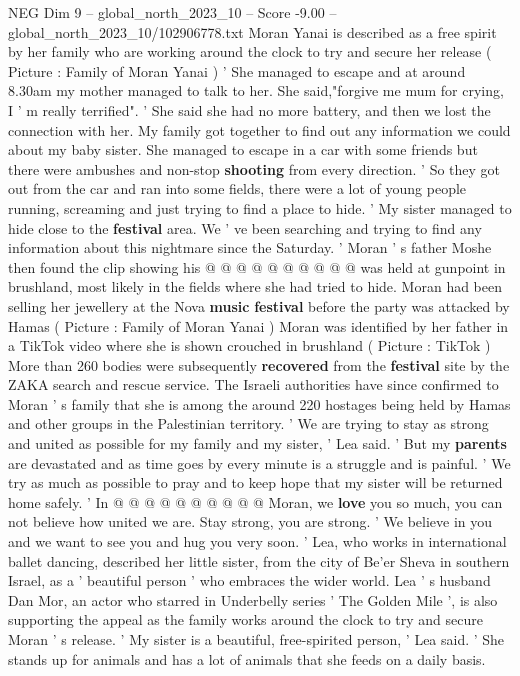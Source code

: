 \begin{textsample}{NEG Dim 9 – global\_north\_2023\_10 – Score -9.00 – global\_north\_2023\_10/102906778.txt}  \label{ex:f9_neg_035}
Moran Yanai is described as a free spirit by her family who are working around the clock to try and secure her release ( Picture : Family of Moran Yanai ) ' She managed to escape and at around 8.30am my mother managed to talk to her.
She said,"forgive me mum for crying, I ' m really terrified". ' She said she had no more battery, and then we lost the connection with her.
My family got together to find out any information we could about my baby sister.
She managed to escape in a car with some friends but there were ambushes and non-stop \textbf{shooting} from every direction. ' So they got out from the car and ran into some fields, there were a lot of young people running, screaming and just trying to find a place to hide. ' My sister managed to hide close to the \textbf{festival} area.
We ' ve been searching and trying to find any information about this nightmare since the Saturday. ' Moran ' s father Moshe then found the clip showing his @ @ @ @ @ @ @ @ @ @ was held at gunpoint in brushland, most likely in the fields where she had tried to hide.
Moran had been selling her jewellery at the Nova \textbf{music} \textbf{festival} before the party was attacked by Hamas ( Picture : Family of Moran Yanai ) Moran was identified by her father in a TikTok video where she is shown crouched in brushland ( Picture : TikTok ) More than 260 bodies were subsequently \textbf{recovered} from the \textbf{festival} site by the ZAKA search and rescue service.
The Israeli authorities have since confirmed to Moran ' s family that she is among the around 220 hostages being held by Hamas and other groups in the Palestinian territory. ' We are trying to stay as strong and united as possible for my family and my sister, ' Lea said. ' But my \textbf{parents} are devastated and as time goes by every minute is a struggle and is painful. ' We try as much as possible to pray and to keep hope that my sister will be returned home safely. ' In @ @ @ @ @ @ @ @ @ @ Moran, we \textbf{love} you so much, you can not believe how united we are.
Stay strong, you are strong. ' We believe in you and we want to see you and hug you very soon. ' Lea, who works in international ballet dancing, described her little sister, from the city of Be'er Sheva in southern Israel, as a ' beautiful person ' who embraces the wider world.
Lea ' s husband Dan Mor, an actor who starred in Underbelly series ' The Golden Mile ', is also supporting the appeal as the family works around the clock to try and secure Moran ' s release. ' My sister is a beautiful, free-spirited person, ' Lea said. ' She stands up for animals and has a lot of animals that she feeds on a daily basis.

\end{textsample}
